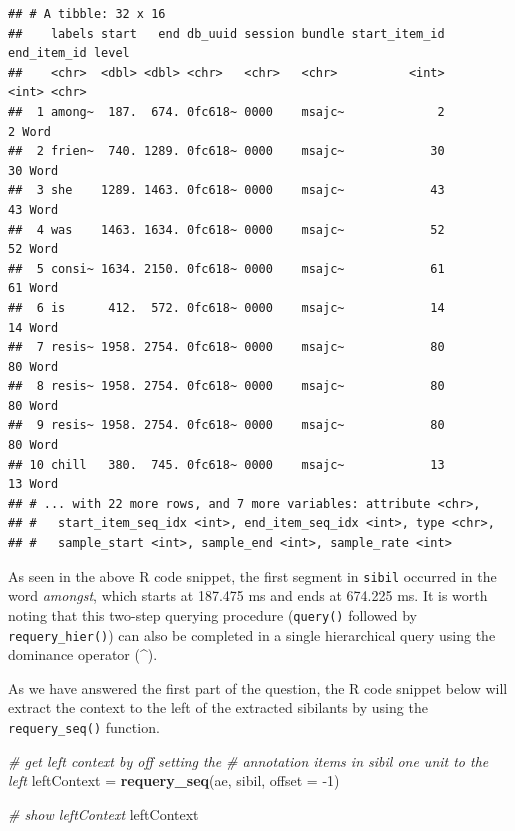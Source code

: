 \documentclass[]{book}
\newenvironment{Shaded}{\begin{snugshade}}{\end{snugshade}}
\newcommand{\CommentTok}[1]{\textcolor[rgb]{0.56,0.35,0.01}{\textit{#1}}}
\newcommand{\DataTypeTok}[1]{\textcolor[rgb]{0.13,0.29,0.53}{#1}}
\newcommand{\DecValTok}[1]{\textcolor[rgb]{0.00,0.00,0.81}{#1}}
\newcommand{\KeywordTok}[1]{\textcolor[rgb]{0.13,0.29,0.53}{\textbf{#1}}}
\newcommand{\NormalTok}[1]{#1}
\newcommand{\StringTok}[1]{\textcolor[rgb]{0.31,0.60,0.02}{#1}}
\begin{document}
\begin{verbatim}
## # A tibble: 32 x 16
##    labels start   end db_uuid session bundle start_item_id end_item_id level
##    <chr>  <dbl> <dbl> <chr>   <chr>   <chr>          <int>       <int> <chr>
##  1 among~  187.  674. 0fc618~ 0000    msajc~             2           2 Word 
##  2 frien~  740. 1289. 0fc618~ 0000    msajc~            30          30 Word 
##  3 she    1289. 1463. 0fc618~ 0000    msajc~            43          43 Word 
##  4 was    1463. 1634. 0fc618~ 0000    msajc~            52          52 Word 
##  5 consi~ 1634. 2150. 0fc618~ 0000    msajc~            61          61 Word 
##  6 is      412.  572. 0fc618~ 0000    msajc~            14          14 Word 
##  7 resis~ 1958. 2754. 0fc618~ 0000    msajc~            80          80 Word 
##  8 resis~ 1958. 2754. 0fc618~ 0000    msajc~            80          80 Word 
##  9 resis~ 1958. 2754. 0fc618~ 0000    msajc~            80          80 Word 
## 10 chill   380.  745. 0fc618~ 0000    msajc~            13          13 Word 
## # ... with 22 more rows, and 7 more variables: attribute <chr>,
## #   start_item_seq_idx <int>, end_item_seq_idx <int>, type <chr>,
## #   sample_start <int>, sample_end <int>, sample_rate <int>
\end{verbatim}

As seen in the above R code snippet, the first segment in \texttt{sibil} occurred in the word \emph{amongst}, which starts at 187.475 ms and ends at 674.225 ms. It is worth noting that this two-step querying procedure (\texttt{query()} followed by \texttt{requery\_hier()}) can also be completed in a single hierarchical query using the dominance operator (\^{}).

As we have answered the first part of the question, the R code snippet below will extract the context to the left of the extracted sibilants by using the \texttt{requery\_seq()} function.

\begin{Shaded}
\begin{Highlighting}[]
\CommentTok{# get left context by off setting the }
\CommentTok{# annotation items in sibil one unit to the left}
\NormalTok{leftContext =}\StringTok{ }\KeywordTok{requery_seq}\NormalTok{(ae, sibil, }\DataTypeTok{offset =} \DecValTok{-1}\NormalTok{)}

\CommentTok{# show leftContext}
\NormalTok{leftContext}
\end{Highlighting}
\end{Shaded}
\end{document}
